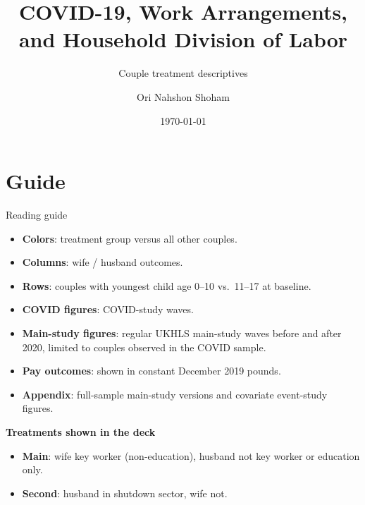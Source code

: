 \documentclass[aspectratio=169,11pt]{beamer}
\title{COVID-19, Work Arrangements, and Household Division of Labor}
\subtitle{Couple treatment descriptives}
\author{Ori Nahshon Shoham}
\date{\today}
\begin{document}
\begin{frame}
\titlepage
\end{frame}

\section{Guide}

\begin{frame}{Reading guide}
\small
\begin{itemize}
  \item \textbf{Colors}: treatment group versus all other couples.
  \item \textbf{Columns}: wife / husband outcomes.
  \item \textbf{Rows}: couples with youngest child age 0--10 vs.\ 11--17 at baseline.
  \item \textbf{COVID figures}: COVID-study waves.
  \item \textbf{Main-study figures}: regular UKHLS main-study waves before and after 2020, limited to couples observed in the COVID sample.
  \item \textbf{Pay outcomes}: shown in constant December 2019 pounds.
  \item \textbf{Appendix}: full-sample main-study versions and covariate event-study figures.
\end{itemize}

\vspace{0.4em}
\textbf{Treatments shown in the deck}
\begin{itemize}
  \item \textbf{Main}: wife key worker (non-education), husband not key worker or education only.
  \item \textbf{Second}: husband in shutdown sector, wife not.
\end{itemize}
\end{frame}
\end{document}
